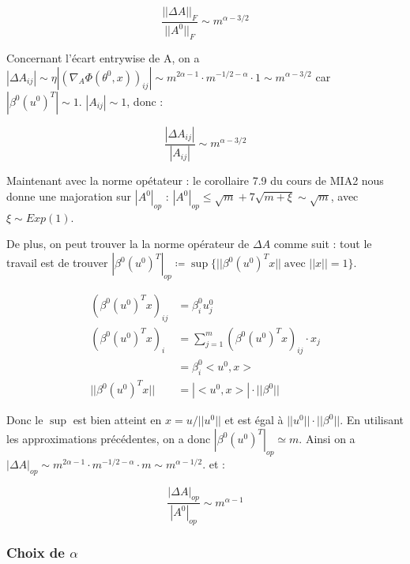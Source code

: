 \documentclass[a4paper, 11pt, french]{article}
\begin{document}
	\[\frac{||\Delta A||_F}{||A^0||_F} \sim m^{\alpha - 3/2}\]
	
	Concernant l'écart entrywise de A, on a $|\Delta A_{ij}| \sim \eta | (\nabla_A \Phi(\theta^0, x))_{ij} | \sim m^{2\alpha - 1} \cdot m^{-1/2 - \alpha} \cdot 1 \sim m^{\alpha - 3/2}$ car $|\beta^0 (u^0)^T| \sim 1$. $|A_{ij}| \sim 1$, donc :

	\[\frac{|\Delta A_{ij}|}{|A_{ij}|} \sim m^{\alpha - 3/2}\]
	
	Maintenant avec la norme opétateur : le corollaire 7.9 du cours de MIA2 nous donne une majoration sur $|A^0|_{op}$ : $|A^0|_{op} \leq \sqrt{m} + 7\sqrt{m + \xi} \sim \sqrt{m}$, avec $\xi \sim Exp(1)$.
	
	De plus, on peut trouver la la norme opérateur de $\Delta A$ comme suit : tout le travail est de trouver $|\beta^0 (u^0)^T|_{op} \coloneqq \sup \{||\beta^0 (u^0)^T x|| \; 
	\text{avec }||x|| = 1\}$.
	
	\begin{align}
		(\beta^0 (u^0)^T x)_{ij} &= \beta^0_i u^0_j \\
		(\beta^0 (u^0)^T x)_i &= \sum_{j=1}^{m} (\beta^0 (u^0)^T x)_{ij} \cdot x_j \\
		&= \beta^0_i < u^0, x> \\
		||\beta^0 (u^0)^T x|| &= |< u^0, x>| \cdot ||\beta^0||
	\end{align}

	Donc le $\sup$ est bien atteint en $x = u / ||u^0||$ et est égal à $||u^0|| \cdot ||\beta^0||$. En utilisant les approximations précédentes, on a donc $|\beta^0 (u^0)^T|_{op} \simeq m$. Ainsi on a $|\Delta A|_{op} \sim m^{2\alpha - 1} \cdot m^{-1/2 - \alpha} \cdot m \sim m^{\alpha - 1/2}.$ et :
	
	\[\frac{|\Delta A|_{op}}{|A^0|_{op}} \sim m^{\alpha - 1}\]
	
	\subsubsection{Choix de $\alpha$}
	
\end{document}
